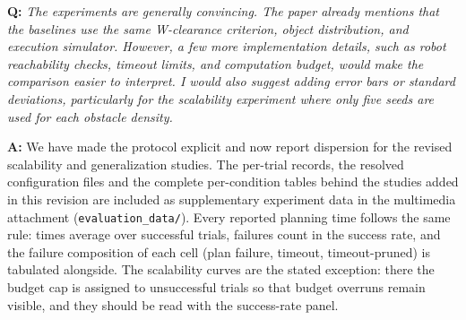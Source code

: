 \documentclass[11pt]{article}
\begin{document}
\begin{shaded*}
\noindent \textbf{Q:}
{\itshape
The experiments are generally convincing. The paper already mentions
that the baselines use the same W-clearance criterion, object
distribution, and execution simulator. However, a few more
implementation details, such as robot reachability checks, timeout
limits, and computation budget, would make the comparison easier to
interpret. I would also suggest adding error bars or standard
deviations, particularly for the scalability experiment where only five
seeds are used for each obstacle density.
}
\end{shaded*}

\noindent \textbf{A:}
We have made the protocol explicit and now report dispersion for the revised scalability and
generalization studies. The per-trial records, the resolved configuration files and the complete per-condition tables behind the studies added in this revision are included as supplementary experiment data in the multimedia attachment (\texttt{evaluation\_data/}). Every reported planning time follows the same rule: times average over successful trials, failures
count in the success rate, and the failure composition of each cell (plan failure, timeout,
timeout-pruned) is tabulated alongside. The scalability curves are the stated exception: there the budget
cap is assigned to unsuccessful trials so that budget overruns remain visible, and they should be
read with the success-rate panel.
\end{document}
